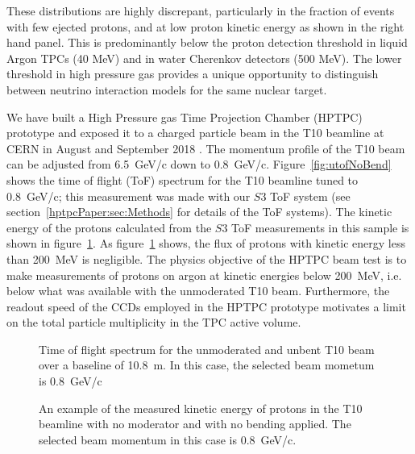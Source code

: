 These distributions are highly discrepant, particularly in the fraction of events with few ejected protons, and at low proton kinetic energy as shown in the right hand panel.
This is predominantly below the proton detection threshold in liquid Argon TPCs (40 MeV) and in water Cherenkov detectors (500 MeV).
The lower threshold in high pressure gas provides a unique opportunity to distinguish between neutrino interaction models for the same nuclear target.

We have built a High Pressure gas Time Projection Chamber (HPTPC) prototype and exposed it to a charged particle beam in the T10 beamline at CERN in August and September 2018 \cite{SPSC-P-355}.
The momentum profile of the T10 beam can be adjusted from 6.5~GeV/c down to 0.8~GeV/c. 
Figure~\ref{fig:utofNoBend} shows the time of flight (ToF) spectrum for the T10 beamline tuned to 0.8~GeV/c; this measurement was made with our $\mathit{S3}$ ToF system (see section~\ref{hptpcPaper:sec:Methods} for details of the ToF systems).
The kinetic energy of the protons calculated from the $\mathit{S3}$ ToF measurements in this sample is shown in figure~\ref{fig:keNoBend}.
As figure~\ref{fig:keNoBend} shows, the flux of protons with kinetic energy less than 200~MeV is negligible.
The physics objective of the HPTPC beam test is to make measurements of protons on argon at kinetic energies below 200~MeV, i.e. below what was available with the unmoderated T10 beam. 
Furthermore, the readout speed of the CCDs employed in the HPTPC prototype motivates a limit on the total particle multiplicity in the TPC active volume.

\begin{figure}
  \begin{minipage}[t]{0.49\textwidth}
    \centering
    \begin{adjustbox}{max totalsize={\textwidth},center}
      
    \end{adjustbox}
    \caption{Time of flight spectrum for the unmoderated and unbent T10 beam over a baseline of 10.8~m. In this case, the selected beam mometum is 0.8~GeV/c}
    \label{fig:utofNoBend}
  \end{minipage}
  \hfill
  \begin{minipage}[t]{0.49\textwidth}
    \centering
    \begin{adjustbox}{max totalsize={\textwidth},center}
      
    \end{adjustbox}
    \caption{An example of the measured kinetic energy of protons in the T10 beamline with no moderator and with no bending applied. The selected beam momentum in this case is 0.8~GeV/c.}
    \label{fig:keNoBend}
  \end{minipage}
\end{figure}

